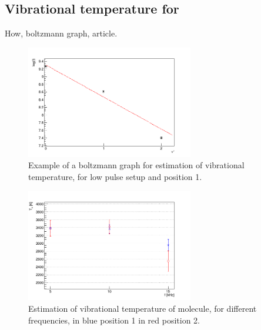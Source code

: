 \subsection{Vibrational temperature for }
How, boltzmann graph, article.

\begin{figure}
\centering
\includegraphics[width=0.65\textwidth]{Images/Spectroscopy/boltzman_f5t16v.png}
 \caption{Example of a boltzmann graph for estimation of vibrational temperature, for low pulse setup and position 1.}
 \label{fig:boltzex}
\end{figure}

\begin{figure}
\centering
\includegraphics[width=0.65\textwidth]{Images/Spectroscopy/TvN2.png}
 \caption{Estimation of vibrational temperature of  molecule, for different frequencies, in blue position 1 in red position 2.}
 \label{fig:TvN2}
\end{figure}





